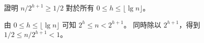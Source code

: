 \startEXERCISE
證明 $n/2^{h+1} \ge 1/2$ 對於所有 $0\le h\le \lfloor \lg n\rfloor$。
\stopEXERCISE

\startANSWER
由 $0\le h\le \lfloor \lg n\rfloor$ 可知 $2^h \le n < 2^{h+1}$。
同時除以 $2^{h+1}$，得到 $1/2 \le n/2^{h+1} < 1$。
\stopANSWER
